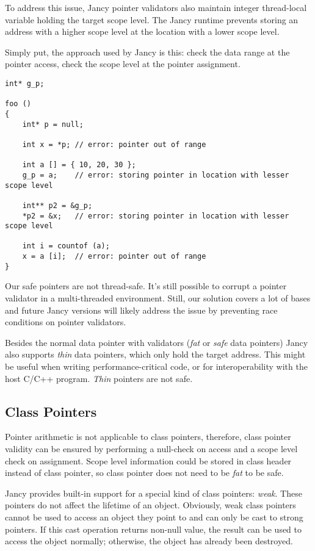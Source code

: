 \documentclass[oneside]{book}
\begin{document}
To address this issue, Jancy pointer validators also maintain integer thread-local variable holding the target scope level. The Jancy runtime prevents storing an address with a higher scope level at the location with a lower scope level.

Simply put, the approach used by Jancy is this: check the data range at the pointer access, check the scope level at the pointer assignment.

\begin{lstlisting}
int* g_p;

foo ()
{
    int* p = null;

    int x = *p; // error: pointer out of range

    int a [] = { 10, 20, 30 };
    g_p = a;    // error: storing pointer in location with lesser scope level

    int** p2 = &g_p;
    *p2 = &x;   // error: storing pointer in location with lesser scope level

    int i = countof (a);
    x = a [i];  // error: pointer out of range
}
\end{lstlisting}

Our safe pointers are not thread-safe. It's still possible to corrupt a pointer validator in a multi-threaded environment. Still, our solution covers a lot of bases and future Jancy versions will likely address the issue by preventing race conditions on pointer validators.

Besides the normal data pointer with validators (\emph{fat} or \emph{safe} data pointers) Jancy also supports \emph{thin} data pointers, which only hold the target address. This might be useful when writing performance-critical code, or for interoperability with the host C/C++ program. \emph{Thin} pointers are not safe.

\subsection{Class Pointers}

Pointer arithmetic is not applicable to class pointers, therefore, class pointer validity can be ensured by performing a null-check on access and a scope level check on assignment. Scope level information could be stored in class header instead of class pointer, so class pointer does not need to be \emph{fat} to be safe.

Jancy provides built-in support for a special kind of class pointers: \emph{weak}. These pointers do not affect the lifetime of an object. Obviously, weak class pointers cannot be used to access an object they point to and can only be cast to strong pointers. If this cast operation returns non-null value, the result can be used to access the object normally; otherwise, the object has already been destroyed.
\end{document}
